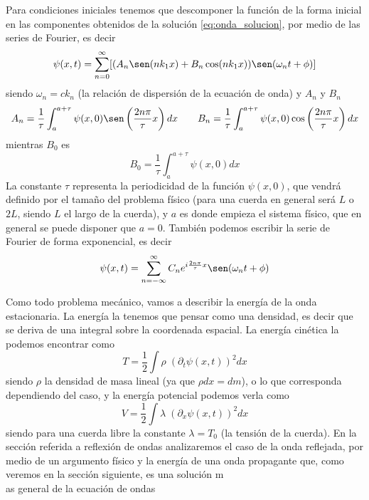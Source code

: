 \documentclass[a4paper,spanish]{article}
\numberwithin{equation}{section}
\begin{document}
			Para condiciones iniciales tenemos que descomponer la funci\'on de la forma inicial en las componentes obtenidos de la soluci\'on \ref{eq:onda_solucion}, por medio de las series de Fourier, es decir
			\begin{equation}
				\psi(x,t) = \sum_{n=0}^{\infty} [(A_n \sen(n k_1 x) + B_n \cos(n k_1 x) ) \sen(\omega_n t + \phi)]
				\label{eq:onda_solucion_fourier}
			\end{equation}
			siendo $\omega_n = c k_n$ (la relaci\'on de dispersi\'on de la ecuaci\'on de onda) y $A_n$ y $B_n$
			\begin{equation}
				A_n = \frac{1}{\tau} \int_{a}^{a + \tau} \psi(x,0) \sen\left(\frac{2 n\pi}{\tau} x\right) dx \qquad B_n = \frac{1}{\tau} \int_{a}^{a + \tau} \psi(x,0) \cos\left(\frac{2 n \pi}{\tau} x\right) dx
			\end{equation}
			mientras $B_0$ es
			\begin{equation}
				B_0  = \frac{1}{\tau} \int_{a}^{a + \tau} \psi(x,0) dx
			\end{equation}
			La constante $\tau$ representa la periodicidad de la funci\'on $\psi(x,0)$, que vendr\'a definido por el tama\~no del problema f\'isico (para una cuerda en general ser\'a $L$ o $2L$, siendo $L$ el largo de la cuerda), y $a$ es donde empieza el sistema f\'isico, que en general se puede disponer que $a = 0$. Tambi\'en podemos escribir la serie de Fourier de forma exponencial, es decir
			\begin{equation}
				\psi(x,t) = \sum_{n=-\infty}^{\infty} C_n e^{i \frac{2 n \pi}{\tau} x} \sen(\omega_n t + \phi)
				\label{eq:onda_solucion_fourier_exp}
			\end{equation}
			
			Como todo problema mec\'anico, vamos a describir la energ\'ia de la onda estacionaria. La energ\'ia la tenemos que pensar como una densidad, es decir que se deriva de una integral sobre la coordenada espacial. La energ\'ia cin\'etica la podemos encontrar como
			\begin{equation}
				T = \frac{1}{2} \int \rho \; (\partial_t \psi(x,t))^2 dx
				\label{eq:ondas_cinetica}
			\end{equation}
			siendo $\rho$ la densidad de masa lineal (ya que $\rho dx = dm$), o lo que corresponda dependiendo del caso, y la energ\'ia potencial podemos verla como 
			\begin{equation}
				V = \frac{1}{2} \int \lambda \; (\partial_x \psi(x,t))^2 dx
				\label{eq:ondas_potencial}
			\end{equation}
			siendo para una cuerda libre la constante $\lambda = T_0$ (la tensi\'on de la cuerda). En la secci\'on referida a reflexi\'on de ondas analizaremos el caso de la onda reflejada, por medio de un argumento f\'isico y la energ\'ia de una onda propagante que, como veremos en la secci\'on siguiente, es una soluci\'on m\\as general de la ecuaci\'on de ondas
			
\end{document}
